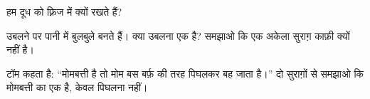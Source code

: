 \begin{exercise}[$\star$]\label{exo:g5:irreversible-changes:9}
हम दूध को फ़्रिज में क्यों रखते हैं?
\end{exercise}

\begin{exercise}[$\star\star$]\label{exo:g5:irreversible-changes:10}
उबलने पर पानी में बुलबुले बनते हैं। क्या उबलना एक  है?
समझाओ कि एक अकेला सुराग़ काफ़ी क्यों नहीं है।
\end{exercise}

\begin{exercise}[$\star\star$]\label{exo:g5:irreversible-changes:11}
टॉम कहता है: ``मोमबत्ती  है तो मोम बस बर्फ़ की तरह पिघलकर बह जाता है।''
दो सुराग़ों से समझाओ कि मोमबत्ती का  एक  है,
केवल पिघलना नहीं।
\end{exercise}
